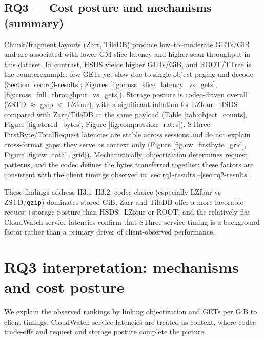 \documentclass[nomenclature, english, bibtex]{kththesis}
\numberwithin{listing}{chapter}
\begin{document}
\subsection{RQ3 — Cost posture and mechanisms (summary)}
\label{sec:ans-rq3}
Chunk/fragment layouts (Zarr, TileDB) produce low–to–moderate GETs/GiB and are associated with lower \gls{GM} slice latency and higher scan throughput in this dataset. In contrast, \gls{HSDS} yields higher GETs/GiB, and \gls{ROOT}/\gls{TTree} is the counterexample: few GETs yet slow due to single-object paging and decode (Section \ref{sec:rq3-results}; Figures \ref{fig:cross_slice_latency_vs_gets}, \ref{fig:cross_full_throughput_vs_gets}). Storage posture is codec-driven overall (\gls{ZSTD} $\approx$ gzip $<$ \gls{LZfour}), with a significant inflation for \gls{LZfour}+\gls{HSDS} compared with Zarr/TileDB at the same payload (Table \ref{tab:object_counts}, Figure \ref{fig:stored_bytes}, Figure \ref{fig:compression_rates}). \gls{SThree} FirstByte/TotalRequest latencies are stable across sessions and do not explain cross-format gaps; they serve as context only (Figure \ref{fig:cw_firstbyte_grid}, Figure \ref{fig:cw_total_grid}). Mechanistically, objectization determines request patterns, and the codec defines the bytes transferred together; these factors are consistent with the client timings observed in \ref{sec:rq1-results}–\ref{sec:rq2-results}.

These findings address H3.1–H3.2: codec choice (especially \gls{LZfour} vs \gls{ZSTD}/\texttt{gzip}) dominates stored GiB, Zarr and TileDB offer a more favorable request+storage posture than \gls{HSDS}+\gls{LZfour} or \gls{ROOT}, and the relatively flat CloudWatch service latencies confirm that \gls{SThree} service timing is a background factor rather than a primary driver of client-observed performance.


\section{RQ3 interpretation: mechanisms and cost posture}
\label{sec:discussion-mechanisms-cost}
We explain the observed rankings by linking objectization and GETs per GiB to client timings. CloudWatch service latencies are treated as context, where codec trade-offs and request and storage posture complete the picture.
\end{document}
